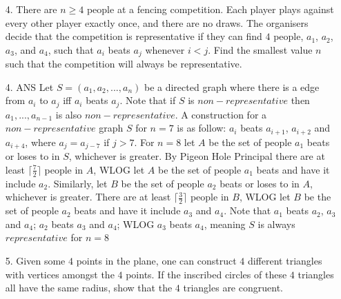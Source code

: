 \documentclass{article}
\begin{document}
\begin{enumerate}
\medskip
\item[4.] %
There are $n \ge 4$ people at a fencing competition.
Each player plays against every other player exactly once, and there are no draws.
The organisers decide that the competition is representative if they can find $4$ people, $a_1$, $a_2$, $a_3$, and $a_4$, such that $a_i$ beats $a_j$ whenever $i < j$.
Find the smallest value $n$ such that the competition will always be representative.
\item[4. ANS]
Let $S = (a_1,a_2,...,a_n)$ be a directed graph where there is a edge from $a_i$ to $a_j$ iff $a_i$ beats $a_j$. Note that if $S$ is $non-representative$ then $a_1,...,a_{n-1}$ is also $non-representative$. A construction for a $non-representative$ graph $S$ for $n=7$ is as follow: $a_i$ beats $a_{i+1}$, $a_{i+2}$ and $a_{i+4}$, where $a_j = a_{j-7}$ if $j>7$. For $n=8$ let $A$ be the set of people $a_1$ beats or loses to in $S$, whichever is greater. By Pigeon Hole Principal there are at least $\lceil{\frac{7}{2}}\rceil$ people in $A$, WLOG let $A$ be the set of people $a_1$ beats and have it include $a_2$. Similarly, let $B$ be the set of people $a_2$ beats or loses to in $A$, whichever is greater. There are at least $\lceil{\frac{3}{2}}\rceil$ people in $B$, WLOG let $B$ be the set of people $a_2$ beats and have it include $a_3$ and $a_4$. Note that $a_1$ beats $a_2$, $a_3$ and $a_4$; $a_2$ beats $a_3$ and $a_4$; WLOG $a_3$ beats $a_4$, meaning $S$ is always $representative$ for $n=8$


\medskip
\item[5.] %
Given some $4$ points in the plane, one can construct $4$ different triangles with vertices amongst the $4$ points.
If the inscribed circles of these $4$ triangles all have the same radius, show that the $4$ triangles are congruent. 


\end{enumerate}
\end{document}
